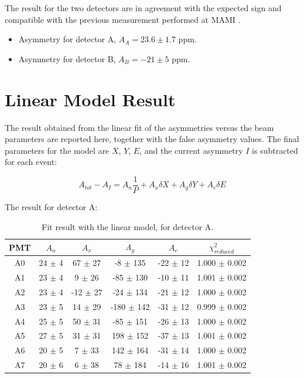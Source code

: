 The result for the two detectors are in agreement with the expected sign and compatible with the previous measurement performed at MAMI \cite{Esser:2018vdp}. 

\begin{itemize}
\item Asymmetry for detector A, $A_{A} =  23.6 \pm 1.7$ ppm.
\item Asymmetry for detector B, $A_{B} = -21 \pm 5$ ppm.
\end{itemize}

\newpage
\section{Linear Model Result}
The result obtained from the linear fit of the asymmetries versus the beam parameters are reported here, together with the false asymmetry values. The final parameters for the model are $X$, $Y$, $E$, and the current asymmetry $I$ is subtracted for each event:

\begin{equation}
A_{tot} - A_{I} = A_{n} \frac{1}{P} + A_{x} \delta X + A_{y} \delta Y + A_{e} \delta E
\end{equation}

The result for detector A: 

\begin{table}[hbtp] 
\centering
\begin{tabular}{c|c|c|c|c|c}
\hline
 PMT   & $A_{n}$    & $A_{x}$          & $A_{y}$            & $A_{e}$         & $\chi^{2}_{reduced}$ \\
\hline
 A0    & 24 $\pm$ 4 & 67 $\pm$ 27  & -8 $\pm$ 135   & -22 $\pm$ 12 & 1.000 $\pm$ 0.002   \\
 A1    & 23 $\pm$ 4 & 9 $\pm$ 26   & -85 $\pm$ 130  & -10 $\pm$ 11 & 1.001 $\pm$ 0.002 \\
 A2    & 23 $\pm$ 4 & -12 $\pm$ 27 & -24 $\pm$ 134  & -21 $\pm$ 12 & 1.000 $\pm$ 0.002   \\
 A3    & 23 $\pm$ 5 & 14 $\pm$ 29  & -180 $\pm$ 142 & -31 $\pm$ 12 & 0.999 $\pm$ 0.002 \\
 A4    & 25 $\pm$ 5 & 50 $\pm$ 31  & -85 $\pm$ 151  & -26 $\pm$ 13 & 1.000 $\pm$ 0.002   \\
 A5    & 27 $\pm$ 5 & 31 $\pm$ 31  & 198 $\pm$ 152  & -37 $\pm$ 13 & 1.001 $\pm$ 0.002 \\
 A6    & 20 $\pm$ 5 & 7 $\pm$ 33   & 142 $\pm$ 164  & -31 $\pm$ 14 & 1.000 $\pm$ 0.002   \\
 A7    & 20 $\pm$ 6 & 6 $\pm$ 38   & 78 $\pm$ 184   & -14 $\pm$ 16 & 1.001 $\pm$ 0.002 \\
\hline
\end{tabular}
\caption{Fit result with the linear model, for detector A.}
\label{tab:resultA}
\end{table}

